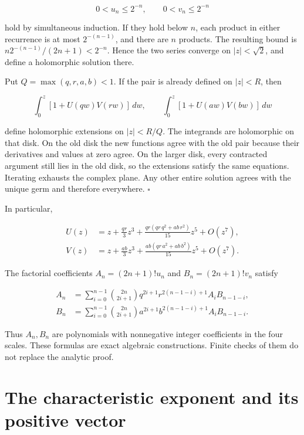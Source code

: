 \[
0<u_n\le2^{-n},\qquad 0<v_n\le2^{-n}
\]

hold by simultaneous induction. If they hold below \(n\), each product
in either recurrence is at most \(2^{-(n-1)}\), and there are \(n\)
products. The resulting bound is \(n2^{-(n-1)}/(2n+1)<2^{-n}\). Hence
the two series converge on \(|z|<\sqrt2\), and define a holomorphic
solution there.

Put \(Q=\max(q,r,a,b)<1\). If the pair is already defined on \(|z|<R\),
then

\[
\int_0^z[1+U(qw)V(rw)]\,dw,\qquad
\int_0^z[1+U(aw)V(bw)]\,dw
\]

define holomorphic extensions on \(|z|<R/Q\). The integrands are
holomorphic on that disk. On the old disk the new functions agree with
the old pair because their derivatives and values at zero agree. On the
larger disk, every contracted argument still lies in the old disk, so
the extensions satisfy the same equations. Iterating exhausts the
complex plane. Any other entire solution agrees with the unique germ and
therefore everywhere. \(\square\)

In particular,

\[
\begin{aligned}
U(z)&=z+\frac{qr}{3}z^3
 +\frac{qr(qr\,q^2+ab\,r^2)}{15}z^5+O(z^7),\\
V(z)&=z+\frac{ab}{3}z^3
 +\frac{ab(qr\,a^2+ab\,b^2)}{15}z^5+O(z^7).
\end{aligned}
\]

The factorial coefficients \(A_n=(2n+1)!u_n\) and \(B_n=(2n+1)!v_n\)
satisfy

\[
\begin{aligned}
A_n&=\sum_{i=0}^{n-1}\binom{2n}{2i+1}
 q^{2i+1}r^{2(n-1-i)+1}A_iB_{n-1-i},\\
B_n&=\sum_{i=0}^{n-1}\binom{2n}{2i+1}
 a^{2i+1}b^{2(n-1-i)+1}A_iB_{n-1-i}.
\end{aligned}
\]

Thus \(A_n,B_n\) are polynomials with nonnegative integer coefficients
in the four scales. These formulas are exact algebraic constructions.
Finite checks of them do not replace the analytic proof.

\hypertarget{v11-coupled_growth_full-the-characteristic-exponent-and-its-positive-vector}{%
\section{The characteristic exponent and its positive
vector}\label{v11-coupled_growth_full-the-characteristic-exponent-and-its-positive-vector}}

